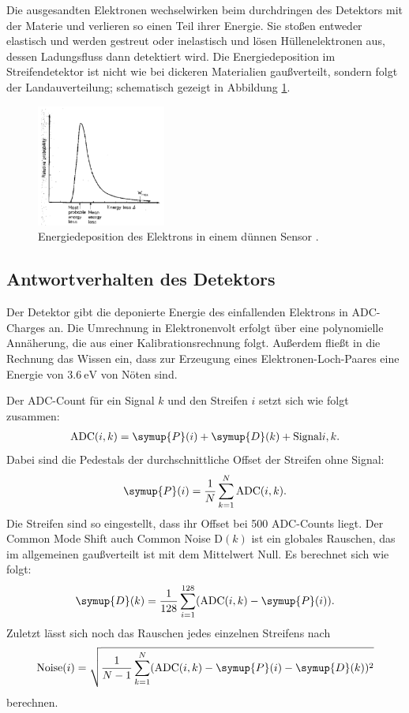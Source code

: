Die ausgesandten Elektronen wechselwirken beim durchdringen des Detektors mit der Materie und verlieren so einen Teil ihrer Energie.
Sie stoßen entweder elastisch und werden gestreut oder inelastisch und lösen Hüllenelektronen aus, dessen Ladungsfluss dann detektiert wird.
Die Energiedeposition im Streifendetektor ist nicht wie bei dickeren Materialien gaußverteilt, sondern folgt der Landauverteilung; schematisch gezeigt in Abbildung \ref{fig:energiedepositionElektron}.
\begin{figure}
  \centering
  \includegraphics[height=4cm]{TimosAufrisse/energiedepositionElektron.png}
  \caption{Energiedeposition des Elektrons in einem dünnen Sensor \cite{anleitung}.}
  \label{fig:energiedepositionElektron}
\end{figure}

\subsection{Antwortverhalten des Detektors}

Der Detektor gibt die deponierte Energie des einfallenden Elektrons in ADC-Charges an. Die Umrechnung in Elektronenvolt erfolgt über eine polynomielle Annäherung, die aus einer Kalibrationsrechnung folgt. Außerdem fließt in die Rechnung das Wissen ein, dass zur Erzeugung eines Elektronen-Loch-Paares eine Energie von $\SI{3.6}{\electronvolt}$ von Nöten sind.

Der ADC-Count für ein Signal $k$ und den Streifen $i$ setzt sich wie folgt zusammen:
\begin{align}
  \text{ADC}(i, k) = \symup{P}(i) + \symup{D}(k) + \text{Signal}{i, k}.
\end{align}
Dabei sind die Pedestals der durchschnittliche Offset der Streifen ohne Signal:
\begin{align}
  \symup{P}(i) = \frac{1}{N} \sum_{k=1}^N \text{ADC}(i, k).
\end{align}
Die Streifen sind so eingestellt, dass ihr Offset bei \num{500} ADC-Counts liegt.
Der Common Mode Shift auch Common Noise D$(k)$ ist ein globales Rauschen, das im allgemeinen gaußverteilt ist mit dem Mittelwert Null. Es berechnet sich wie folgt:
\begin{align}
  \symup{D}(k) = \frac{1}{128} \sum_{i=1}^{128} (\text{ADC}(i, k) - \symup{P}(i)).
\end{align}
Zuletzt lässt sich noch das Rauschen jedes einzelnen Streifens nach
\begin{align}
  \text{Noise}(i) = \sqrt{\frac{1}{N-1} \sum_{k=1}^N(\text{ADC}(i, k) - \symup{P}(i) - \symup{D}(k))^2}
\end{align}
berechnen.


